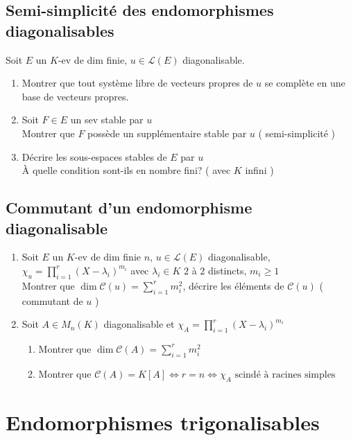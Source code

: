 \documentclass[10pt,a4paper]{article}
\theoremstyle{definition}
\begin{document}
\subsection{Semi-simplicité des endomorphismes diagonalisables}
\noindent Soit $E$ un $K$-ev de dim finie, $u \in \mathcal{L}(E)$ diagonalisable.
\begin{enumerate}
\item Montrer que tout système libre de vecteurs propres de $u$ se complète en une base de vecteurs propres.
\item Soit $F \in E$ un sev stable par $u$ \\
Montrer que $F$ possède un supplémentaire stable par $u$ ( semi-simplicité )
\item Décrire les sous-espaces stables de $E$ par $u$ \\
À quelle condition sont-ils en nombre fini? ( avec $K$ infini )
\end{enumerate}

\subsection{Commutant d'un endomorphisme diagonalisable}
\begin{enumerate}
\item Soit $E$ un $K$-ev de dim finie $n$, $u \in \mathcal{L}(E)$ diagonalisable, \\
$\chi_u = \prod\limits_{i = 1}^r (X - \lambda_i)^{m_i}$ avec $\lambda_i \in K$ $2$ à $2$ distincts, $m_i \geq 1$ \\
Montrer que $\dim \mathcal{C}(u) = \sum\limits_{i = 1}^r m_i^2$, décrire les éléments de $\mathcal{C}(u)$ ( commutant de $u$ )
\item Soit $A \in M_n(K)$ diagonalisable et $\chi_A = \prod\limits_{i = 1}^r (X - \lambda_i)^{m_i}$
\begin{enumerate}
\item Montrer que $\dim \mathcal{C}(A) = \sum\limits_{i = 1}^r m_i^2$
\item Montrer que $\mathcal{C}(A) = K[A] \iff r = n \iff \chi_A \text { scindé à racines simples }$
\end{enumerate}
\end{enumerate}

\section{Endomorphismes trigonalisables}
\end{document}
